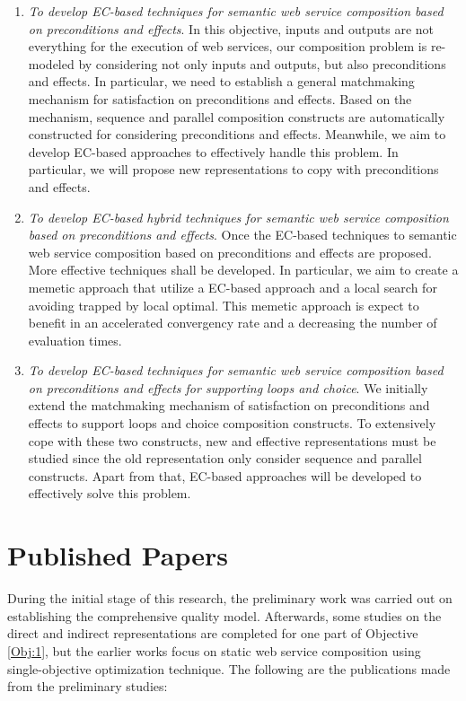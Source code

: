\begin{enumerate}
\begin{enumerate}
  \item \emph{To develop EC-based techniques for semantic web service composition based on preconditions and effects}. In this objective, inputs and outputs are not everything for the execution of web services, our composition problem is re-modeled by considering not only inputs and outputs, but also preconditions and effects. In particular, we need to establish a general matchmaking mechanism for satisfaction on preconditions and effects. Based on the mechanism, sequence and parallel composition constructs are automatically constructed for considering preconditions and effects. Meanwhile, we aim to develop EC-based approaches to effectively handle this problem. In particular, we will propose new representations to copy with preconditions and effects.

  \item \emph{To develop EC-based hybrid techniques for semantic web service composition based on preconditions and effects}. Once the EC-based techniques to semantic web service composition based on preconditions and effects are proposed. More effective techniques shall be developed. In particular, we aim to create a memetic approach that utilize a EC-based approach and a local search for avoiding trapped by local optimal. This memetic approach is expect to benefit in an accelerated convergency rate and a decreasing the number of evaluation times.
    
   \item \emph{To develop EC-based techniques for semantic web service composition based on preconditions and effects for supporting loops and choice}. We initially extend the matchmaking mechanism of satisfaction on preconditions and effects to support loops and choice composition constructs. To extensively cope with these two constructs, new and effective representations must be studied since the old representation only consider sequence and parallel constructs. Apart from that, EC-based approaches will be developed to effectively solve this problem.

 
 \end{enumerate}
 
\end{enumerate}

\section{Published Papers}

During the initial stage of this research, the preliminary work was carried out on establishing the comprehensive quality model.  Afterwards, some studies on the direct and indirect representations are completed for one part of Objective \ref{Obj:1}, but the earlier works focus on static web service composition using single-objective optimization technique. The following are the publications made from the preliminary studies:

